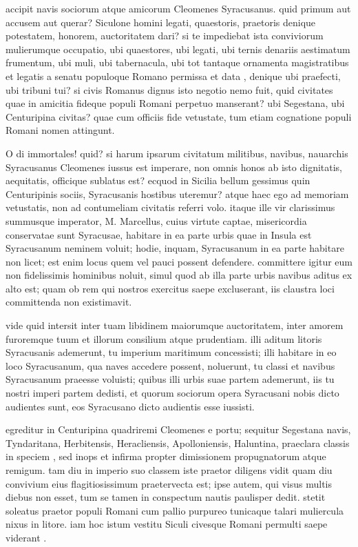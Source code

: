  accipit navis sociorum atque amicorum Cleomenes Syracusanus. quid primum aut accusem aut querar? Siculone homini legati, quaestoris, praetoris denique potestatem, honorem, auctoritatem dari? si te impediebat ista conviviorum mulierumque occupatio, ubi quaestores, ubi legati, ubi ternis denariis aestimatum frumentum, ubi muli, ubi tabernacula, ubi tot tantaque ornamenta magistratibus et legatis a senatu populoque Romano permissa et data , denique ubi praefecti, ubi tribuni tui? si civis Romanus dignus isto negotio nemo fuit, quid civitates quae in amicitia fideque populi Romani perpetuo manserant? ubi Segestana, ubi Centuripina civitas? quae cum officiis fide vetustate, tum etiam cognatione populi Romani nomen attingunt.

 O di immortales! quid? si harum ipsarum civitatum militibus, navibus, nauarchis Syracusanus Cleomenes iussus est imperare, non omnis honos ab isto dignitatis, aequitatis, officique sublatus est? ecquod in Sicilia bellum gessimus quin Centuripinis sociis, Syracusanis hostibus uteremur? atque haec ego ad memoriam vetustatis, non ad contumeliam civitatis referri volo. itaque ille vir clarissimus summusque imperator, M. Marcellus, cuius virtute captae, misericordia conservatae sunt Syracusae, habitare in ea parte urbis quae in Insula est Syracusanum neminem voluit; hodie, inquam, Syracusanum in ea parte habitare non licet; est enim locus quem vel pauci possent defendere. committere igitur eum non fidelissimis hominibus noluit, simul quod ab illa parte urbis navibus aditus ex alto est; quam ob rem qui nostros exercitus saepe excluserant, iis claustra loci committenda non existimavit.

 vide quid intersit inter tuam libidinem maiorumque auctoritatem, inter amorem furoremque tuum et illorum consilium atque prudentiam. illi aditum litoris Syracusanis ademerunt, tu imperium maritimum concessisti; illi habitare in eo loco Syracusanum, qua naves accedere possent, noluerunt, tu classi et navibus Syracusanum praeesse voluisti; quibus illi urbis suae partem ademerunt, iis tu nostri imperi partem dedisti, et quorum sociorum opera Syracusani nobis dicto audientes sunt, eos Syracusano dicto audientis esse iussisti.

 egreditur in Centuripina quadriremi Cleomenes e portu; sequitur Segestana navis, Tyndaritana, Herbitensis, Heracliensis, Apolloniensis, Haluntina, praeclara classis in speciem , sed inops et infirma propter dimissionem propugnatorum atque remigum. tam diu in imperio suo classem iste praetor diligens vidit quam diu convivium eius flagitiosissimum praetervecta est; ipse autem, qui visus multis diebus non esset, tum se tamen in conspectum nautis paulisper dedit. stetit soleatus praetor populi Romani cum pallio purpureo tunicaque talari muliercula nixus in litore. iam hoc istum vestitu Siculi civesque Romani permulti saepe viderant .

